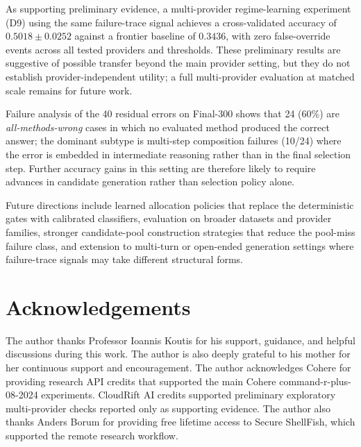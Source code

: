 \documentclass[smallcondensed]{svjour3}
\begin{document}
As supporting preliminary evidence, a multi-provider regime-learning experiment (D9) using
the same failure-trace signal achieves a cross-validated accuracy of
$0.5018 \pm 0.0252$ against a frontier baseline of $0.3436$, with zero
false-override events across all tested providers and thresholds.
These preliminary results are suggestive of possible transfer beyond the
main provider setting, but they do not establish provider-independent
utility; a full multi-provider evaluation at matched scale remains for
future work.

Failure analysis of the 40 residual errors on Final-300 shows that 24 (60\%)
are \emph{all-methods-wrong} cases in which no evaluated method produced the
correct answer; the dominant subtype is multi-step composition failures
(10/24) where the error is embedded in intermediate reasoning rather than in
the final selection step.
Further accuracy gains in this setting are therefore likely to require
advances in candidate generation rather than selection policy alone.

Future directions include learned allocation policies that replace the
deterministic gates with calibrated classifiers, evaluation on broader
datasets and provider families, stronger candidate-pool construction
strategies that reduce the pool-miss failure class, and extension to
multi-turn or open-ended generation settings where failure-trace signals may
take different structural forms.

\section*{Acknowledgements}
The author thanks Professor Ioannis Koutis for his support, guidance, and helpful
discussions during this work. The author is also deeply grateful to his mother for
her continuous support and encouragement. The author acknowledges Cohere for providing research API credits that
supported the main Cohere command-r-plus-08-2024 experiments. CloudRift AI
credits supported preliminary exploratory multi-provider checks reported only
as supporting evidence. The author also thanks Anders Borum for providing free
lifetime access to Secure ShellFish, which supported the remote research
workflow.

\end{document}
